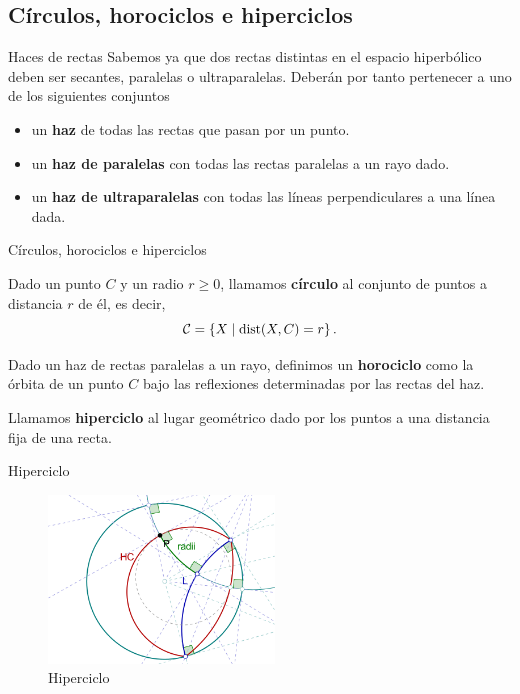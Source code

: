 \documentclass[compress]{beamer}
\begin{document}
\subsection{Círculos, horociclos e hiperciclos}
\begin{frame}{Haces de rectas}
  Sabemos ya que dos rectas distintas en el espacio hiperbólico
  deben ser secantes, paralelas o ultraparalelas. Deberán por tanto
  pertenecer a uno de los siguientes conjuntos

  \begin{itemize}
  \item un \textbf{haz} de todas las rectas que pasan por un punto.
  \item un \textbf{haz de paralelas} con todas las rectas paralelas a un
    rayo dado.
  \item un \textbf{haz de ultraparalelas} con todas las líneas
    perpendiculares a una línea dada.
  \end{itemize}
\end{frame}

\begin{frame}{Círculos, horociclos e hiperciclos}
  \begin{definition}[Círculo]
    Dado un punto $C$ y un radio $r \geq 0$, llamamos \textbf{círculo}
    al conjunto de puntos a distancia $r$ de él, es decir,
    \[{\cal C} = \left\{ X \mid \mathrm{dist}(X,C) = r \right\}.\]
  \end{definition}

  \begin{definition}[Horociclo]
    Dado un haz de rectas paralelas a un rayo, definimos un \textbf{horociclo} como
    la órbita de un punto $C$ bajo las reflexiones determinadas por las rectas del
    haz. \cite{coxeter}
  \end{definition}

  \begin{definition}[Hiperciclo]
    Llamamos \textbf{hiperciclo} al lugar geométrico dado por los puntos a
    una distancia fija de una recta.
  \end{definition}
\end{frame}

\begin{frame}{Hiperciclo}
  \begin{figure}[ht!]
    \centering
    \includegraphics[width=60mm]{./hyper.png}
    \caption{Hiperciclo \label{hexagon}}
  \end{figure}
\end{frame}
\end{document}
